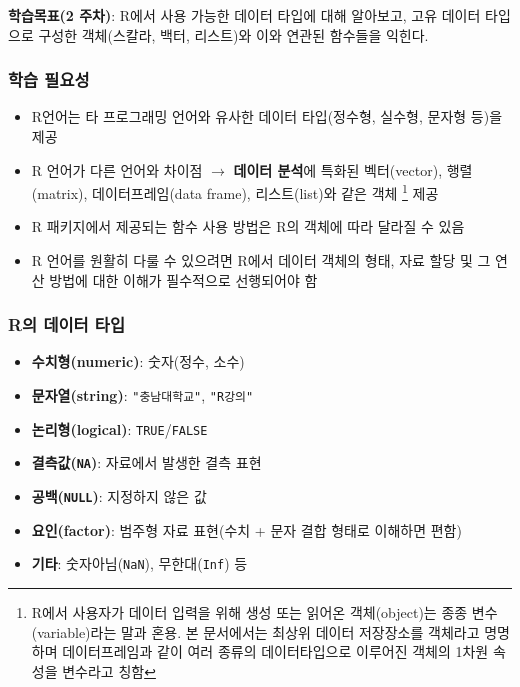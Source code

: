 \documentclass[
  11pt,
]{krantz}
\makeatletter
\providecommand{\tightlist}{%
  \setlength{\itemsep}{0pt}\setlength{\parskip}{0pt}}
\newenvironment{kframe}{%
\medskip{}
\setlength{\fboxsep}{.8em}
 \def\at@end@of@kframe{}%
 \ifinner\ifhmode%
  \def\at@end@of@kframe{\end{minipage}}%
  \begin{minipage}{\columnwidth}%
 \fi\fi%
 \def\FrameCommand##1{\hskip\@totalleftmargin \hskip-\fboxsep
 \colorbox{shadecolor}{##1}\hskip-\fboxsep
     \hskip-\linewidth \hskip-\@totalleftmargin \hskip\columnwidth}%
 \MakeFramed {\advance\hsize-\width
   \@totalleftmargin\z@ \linewidth\hsize
   \@setminipage}}%
 {\par\unskip\endMakeFramed%
 \at@end@of@kframe}
\newenvironment{rmdblock}[1]
  {
  \begin{itemize}
  \renewcommand{\labelitemi}{
    \raisebox{-.7\height}[0pt][0pt]{
      {\setkeys{Gin}{width=3em,keepaspectratio}\texttt{[image: images/\#1]}}
    }
  }
  \setlength{\fboxsep}{1em}
  \begin{kframe}
  \item
  }
  {
  \end{kframe}
  \end{itemize}
  }
\newenvironment{rmdnote}
  {\begin{rmdblock}{note}}
  {\end{rmdblock}}
\makeatother
\begin{document}
\footnotesize

\begin{rmdnote}
\textbf{학습목표(2 주차)}: R에서 사용 가능한 데이터 타입에 대해 알아보고, 고유 데이터 타입으로 구성한 객체(스칼라, 백터, 리스트)와 이와 연관된 함수들을 익힌다.
\end{rmdnote}

\normalsize

\hypertarget{ch2-abstract}{%
\subsubsection*{학습 필요성}\label{ch2-abstract}}


\begin{itemize}
\tightlist
\item
  R언어는 타 프로그래밍 언어와 유사한 데이터 타입(정수형, 실수형, 문자형 등)을 제공
\item
  R 언어가 다른 언어와 차이점 \(\rightarrow\) \textbf{데이터 분석}에 특화된 벡터(vector), 행렬(matrix),
  데이터프레임(data frame), 리스트(list)와 같은 객체 \footnote{R에서 사용자가 데이터 입력을 위해 생성 또는 읽어온 객체(object)는 종종 변수(variable)라는 말과 혼용.
    본 문서에서는 최상위 데이터 저장장소를 객체라고 명명하며 데이터프레임과 같이 여러 종류의 데이터타입으로 이루어진 객체의 1차원 속성을 변수라고 칭함} 제공
\item
  R 패키지에서 제공되는 함수 사용 방법은 R의 객체에 따라 달라질 수 있음\\
\item
  R 언어를 원활히 다룰 수 있으려면 R에서 데이터 객체의 형태, 자료 할당 및 그 연산 방법에 대한 이해가 필수적으로 선행되어야 함
\end{itemize}

\hypertarget{object-value}{%
\subsubsection*{R의 데이터 타입}\label{object-value}}


\begin{itemize}
\item
  \textbf{수치형(numeric)}: 숫자(정수, 소수)
\item
  \textbf{문자열(string)}: \texttt{"충남대학교"}, \texttt{"R강의"}
\item
  \textbf{논리형(logical)}: \texttt{TRUE}/\texttt{FALSE}
\item
  \textbf{결측값(\texttt{NA})}: 자료에서 발생한 결측 표현
\item
  \textbf{공백(\texttt{NULL})}: 지정하지 않은 값
\item
  \textbf{요인(factor)}: 범주형 자료 표현(수치 + 문자 결합 형태로 이해하면 편함)
\item
  \textbf{기타}: 숫자아님(\texttt{NaN}), 무한대(\texttt{Inf}) 등
\end{itemize}
\end{document}

